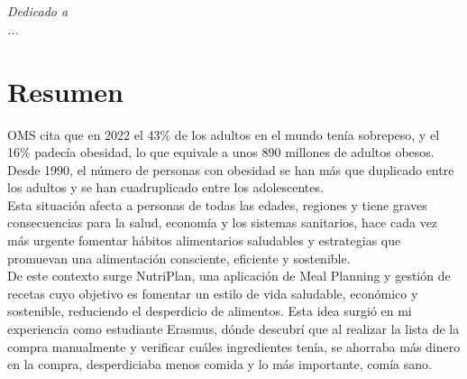 \documentclass[twoside, openright, 11pt]{report}
\begin{document}
\chapter*{}
\begin{flushright}
\textit{Dedicado a \\
...}
\end{flushright}
\thispagestyle{empty}




\chapter*{Resumen} %
\thispagestyle{empty}
OMS cita que en 2022 el 43\% de los adultos en el mundo tenía sobrepeso, y el 16\% padecía obesidad, lo que equivale a unos 890 millones de adultos obesos\cite{OMSObesidadySobrepeso}. Desde 1990, el número de personas con obesidad se han más que duplicado entre los adultos y se han cuadruplicado entre los adolescentes\cite{ONUAAComercioAlimentosyObesidad}.
\\Esta situación afecta a personas de todas las edades, regiones y tiene graves consecuencias para la salud, economía y los sistemas sanitarios, hace cada vez más urgente fomentar hábitos alimentarios saludables y estrategias que promuevan una alimentación consciente, eficiente y sostenible.
\\De este contexto surge NutriPlan, una aplicación de Meal Planning y gestión de recetas cuyo objetivo es fomentar un estilo de vida saludable, económico y sostenible, reduciendo el desperdicio de alimentos. 
Esta idea surgió en mi experiencia como estudiante Erasmus, dónde descubrí que al realizar la lista de la compra manualmente y verificar cuáles ingredientes tenía, se ahorraba más dinero en la compra, desperdiciaba menos comida y lo más importante, comía sano.
\end{document}
